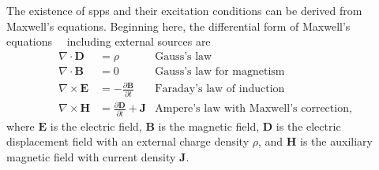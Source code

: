 The existence of \glspl{spp} and their excitation conditions
can be derived from Maxwell's equations.  Beginning here, the differential form of
Maxwell's equations~\cite{maier2007plasmonics}~\cite{benson2009elements}
including external sources are
\begin{align}
\nabla \cdot \mathbf{D} &= \rho & \text{Gauss's law} \label{eqn:gausslaw}\\
\nabla \cdot \mathbf{B} &= 0 & \text{Gauss's law for magnetism} \label{eqn:gausslawmagnetism}\\
\nabla \times \mathbf{E} &= -\frac{\partial \mathbf{B}} {\partial t}
& \text{Faraday's law of induction} \label{eqn:faradayslaw} \\
\nabla \times \mathbf{H} &= \frac{\partial \mathbf{D}} {\partial
t} + \mathbf{J}  & \text{Ampere's law with Maxwell's correction},
\label{eqn:ampereslaw}
\end{align}
where $\mathbf{E}$ is the electric field, $\mathbf{B}$ is the magnetic
field, $\mathbf{D}$ is the electric displacement field with an external
charge density $\rho$, and $\mathbf{H}$ is the auxiliary magnetic field
with current density $\mathbf{J}$.

